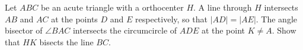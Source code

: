Let $ABC$ be an acute triangle with a orthocenter $H$.
A line through $H$ intersects $AB$ and $AC$ at the points $D$ and $E$ respectively,
so that $|AD|=|AE|$. The angle bisector of $\angle BAC$ intersects the circumcircle of $ADE$ at
the point $K \neq A$. Show that $HK$ bisects the line $BC$.